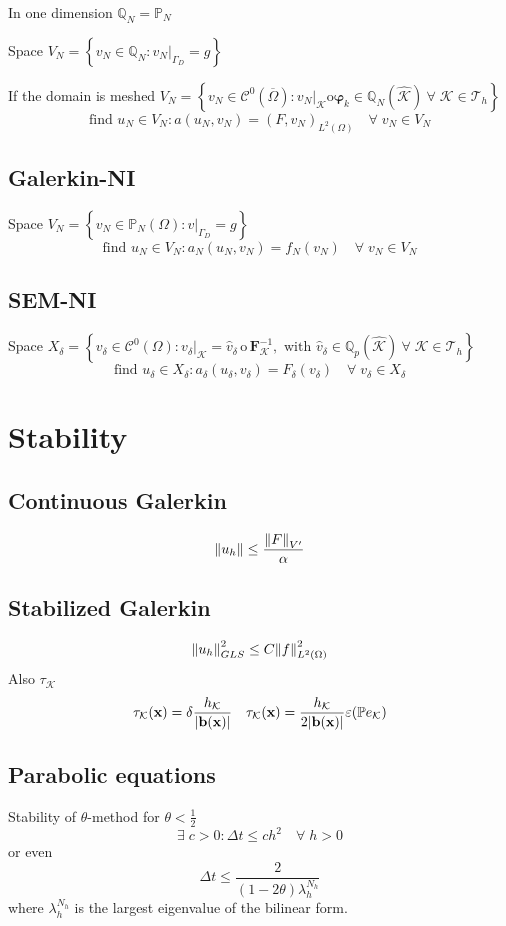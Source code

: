 \documentclass[a4paper,11pt]{article}
\theoremstyle{break}
\newcommand{\vect}[1]{\textbf{#1}}
\let\epsilon\varepsilon
\let\phi\varphi
\newcommand*{\txt}[1]{\text{#1}}
\newcommand*{\limited}[1]{\vert_{#1}}
\newcommand{\element}{\mathcal{K}}
\newcommand{\triangulation}{\mathcal{T}_h}
\newcommand{\eit}{{\element\in\triangulation}}
\newcommand{\peclet}{\mathbb{P}e}
\newcommand{\xvec}{\vect{x}}
\newcommand{\tstep}{\Delta t}
\newcommand{\onehalf}{\frac{1}{2}}
\newcommand{\find}{\txt{find }}
\numberwithin{equation}{section}
\begin{document}
In one dimension \(\mathbb{Q}_N = \mathbb{P}_N\)

Space \(V_N = \left\{ v_N \in \mathbb{Q}_N : v_N\limited{\Gamma_D} = g \right\}\)

If the domain is meshed \(V_N = \left\{ v_N \in \mathcal{C}^0(\overline{\Omega}): v_N\limited{\element} \mathrm{o} \bm{\phi}_k \in \mathbb{Q}_N(\hat{\element}) \ \forall \; \eit \right\}\)
\[
    \find u_N \in V_N: a(u_N, v_N) = (F, v_N)_{L^2(\Omega)} \quad \forall \; v_N \in V_N
\]
\subsection*{Galerkin-NI}
Space \(V_N = \left\{ v_N \in \mathbb{P}_N(\Omega) : v\limited{\Gamma_D} = g \right\}\)
\[
    \find u_N \in V_N : a_N(u_N,v_N) = f_N(v_N) \quad \forall \; v_N \in V_N
\]
\subsection*{SEM-NI}
Space \(X_\delta= \left\{ v_\delta \in \mathcal{C}^0(\Omega) : v_\delta\limited{\element} = \hat{v}_\delta \, \mathrm{o}\, \vect{F}^{-1}_\element, \txt{ with } \hat{v}_\delta \in \mathbb{Q}_p(\hat{\element}) \ \forall \; \eit \right\}\)
\[
    \find u_\delta \in X_\delta : a_\delta(u_\delta, v_\delta) = F_\delta(v_\delta) \quad \forall \; v_\delta \in X_\delta
\]
\section*{Stability}
\subsection*{Continuous Galerkin}
\[
    \norm{u_h} \leq \frac{\norm{F}_{V'}}{\alpha}
\]
\subsection*{Stabilized Galerkin}
\[
    \norm{u_h}_{GLS}^2 \leq C \norm{f}_{L^2(\Omega)}^2
\]
Also \(\tau_\element\)
\[
    \tau_\element(\xvec) = \delta\frac{h_\element}{\abs{\vect{b}(\xvec)}} \quad \tau_\element(\xvec) = \frac{h_\element}{2\abs{\vect{b}(\xvec)}} \epsilon(\peclet_\element)
\]
\subsection*{Parabolic equations}
Stability of \(\theta\)-method for \(\theta <\onehalf\) 
\[
    \exists \; c > 0: \tstep \leq ch^2 \quad \forall \; h > 0
\]
or even 
\[
    \tstep \leq \frac{2}{(1-2\theta)\lambda_h^{N_h}}
\]
where \(\lambda_h^{N_h}\) is the largest eigenvalue of the bilinear form.
\end{document}
